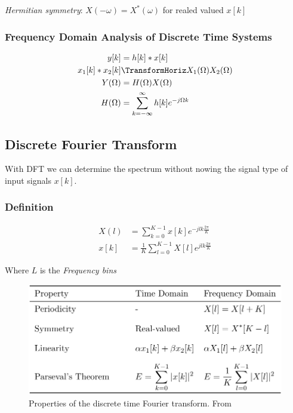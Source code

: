

\textit{Hermitian symmetry}: $X(-\omega)=X^*(\omega)$ for realed valued $x[k]$

\subsubsection{Frequency Domain Analysis of Discrete Time Systems}
\begin{align*}
    y[k] &= h[k]*x[k] \\
    x_1[k]*x_2[k] &\TransformHoriz  X_1(\Omega)X_2(\Omega) \\
    Y(\Omega) &= H(\Omega)X(\Omega) \\
    H(\Omega) &= \sum_{k=-\infty}^{\infty} h[k]e^{-j\Omega k}
\end{align*}


\newpage
\subsection{Discrete Fourier Transform}
With DFT we can determine the spectrum without nowing the signal type
of input signals $x[k]$.

\subsubsection{Definition}
\begin{align*}
    X(l) &= \sum_{k=0}^{K-1} x[k]e^{-jlk\frac{2\pi}{K}} \\
    x[k] &= \frac{1}{K}\sum_{l=0}^{K-1}X[l]e^{jlk\frac{2\pi}{K}}
\end{align*}

Where $L$ is the \textit{Frequency bins}

\begin{figure}[!ht]
    \centering
    \includegraphics[width=12cm]{image/properties_of_the_dft.png}
    \caption{Properties of the discrete time Fourier transform. From \cite{}}
    \label{fig:properties_of_the_dft}
\end{figure}


